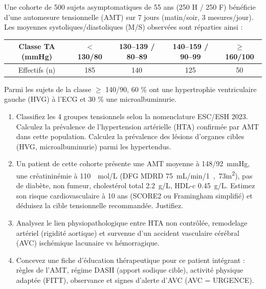\documentclass[11pt]{article}
\begin{document}
\begin{exercice}
Une cohorte de 500 sujets asymptomatiques de 55 ans (250 H / 250 F) bénéficie d'une automesure tensionnelle (AMT) sur 7 jours (matin/soir, 3 mesures/jour). Les moyennes systoliques/diastoliques (M/S) observées sont réparties ainsi :
\begin{center}
\begin{tabular}{|c|c|c|c|c|}
\hline
Classe TA (mmHg) & $<$ 130/80 & 130--139 / 80--89 & 140--159 / 90--99 & $\ge$ 160/100 \\ \hline
Effectifs (n) & 185 & 140 & 125 & 50 \\ \hline
\end{tabular}
\end{center}
Parmi les sujets de la classe $\ge$ 140/90, 60 \% ont une hypertrophie ventriculaire gauche (HVG) à l'ECG et 30 \% une microalbuminurie.
\begin{enumerate}
    \item Classifiez les 4 groupes tensionnels selon la nomenclature ESC/ESH 2023. Calculez la prévalence de l'hypertension artérielle (HTA) confirmée par AMT dans cette population. Calculez la prévalence des lésions d'organes cibles (HVG, microalbuminurie) parmi les hypertendus.
    \item Un patient de cette cohorte présente une AMT moyenne à \SI{148/92}{mmHg}, une créatininémie à \SI{110}{\mu mol/L} (DFG MDRD \SI{75}{mL/min/1,73m^2}), pas de diabète, non fumeur, cholestérol total \SI{2,2}{g/L}, HDL-c \SI{0,45}{g/L}. Estimez son risque cardiovasculaire à 10 ans (SCORE2 ou Framingham simplifié) et déduisez la cible tensionnelle recommandée. Justifiez.
    \item Analysez le lien physiopathologique entre HTA non contrôlée, remodelage artériel (rigidité aortique) et survenue d'un accident vasculaire cérébral (AVC) ischémique lacunaire vs hémorragique.
    \item Concevez une fiche d'éducation thérapeutique pour ce patient intégrant : règles de l'AMT, régime DASH (apport sodique cible), activité physique adaptée (FITT), observance et signes d'alerte d'AVC (AVC = URGENCE).
\end{enumerate}
\end{exercice}
\end{document}
